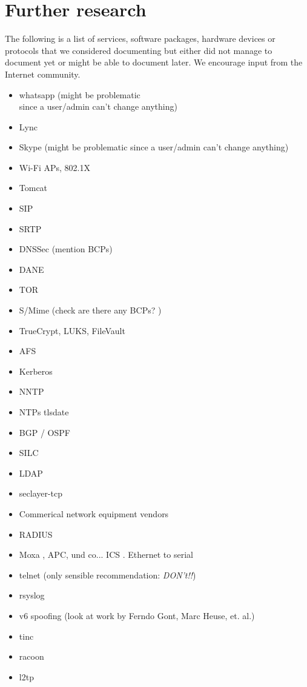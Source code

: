 \chapter{Further research}
\label{cha:further-research}
The following is a list of services, software packages, hardware devices or protocols that we considered documenting but either did not manage to document yet or might be able to document later. We encourage input from the Internet community. 

\begin{itemize}
\item whatsapp (might be problematic\\ since a user/admin can't change anything)
\item Lync
\item Skype (might be problematic since a user/admin can't change anything)
\item Wi-Fi APs, 802.1X
\item Tomcat
\item SIP 
\item SRTP 
\item DNSSec (mention BCPs) 
\item DANE
\item TOR 
\item S/Mime (check are there any BCPs? )
\item TrueCrypt, LUKS, FileVault
\item AFS 
\item Kerberos 
\item NNTP 
\item NTPs tlsdate 
\item BGP / OSPF 
\item SILC
\item LDAP
\item seclayer-tcp
\item Commerical network equipment vendors
\item RADIUS 
\item Moxa , APC, und co... ICS . Ethernet to serial 
\item telnet (only sensible recommendation: \emph{DON't!!})
\item rsyslog 
\item v6 spoofing (look at work by Ferndo Gont, Marc Heuse, et. al.)
\item tinc
\item racoon
\item l2tp

\end{itemize}
